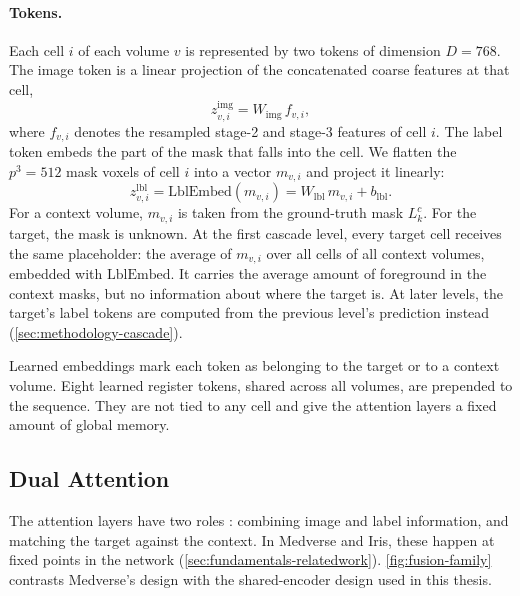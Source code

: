 \documentclass[hidelinks, a4paper, 12pt, ngerman, english]{article}  %
\begin{document}
\paragraph{Tokens.}
Each cell $i$ of each volume $v$ is represented by two tokens of dimension
$D = 768$. The image token is a linear projection of the concatenated coarse
features at that cell,
%
\begin{equation}
  z^{\text{img}}_{v,i} = W_{\text{img}} \, f_{v,i},
  \label{eq:img-token}
\end{equation}
%
where $f_{v,i}$ denotes the resampled stage-2 and stage-3 features of cell $i$.
The label token embeds the part of the mask that falls into the cell. We
flatten the $p^3 = 512$ mask voxels of cell $i$ into a vector $m_{v,i}$ and
project it linearly:
%
\begin{equation}
  z^{\text{lbl}}_{v,i} = \mathrm{LblEmbed}(m_{v,i}) = W_{\text{lbl}} \, m_{v,i} + b_{\text{lbl}}.
  \label{eq:lbl-token}
\end{equation}
%
For a context volume, $m_{v,i}$ is taken from the ground-truth mask $L^c_k$.
For the target, the mask is unknown. At the first cascade level, every target
cell receives the same placeholder: the average of $m_{v,i}$ over all cells of
all context volumes, embedded with $\mathrm{LblEmbed}$. It carries the average
amount of foreground in the context masks, but no information about where the
target is. At later levels, the target's label tokens are computed from the
previous level's prediction instead (\autoref{sec:methodology-cascade}).

Learned embeddings mark each token as belonging to the target or to a context
volume. Eight learned register tokens, shared across all volumes, are
prepended to the sequence. They are not tied to any cell and give the
attention layers a fixed amount of global memory.
\subsection{Dual Attention}\label{sec:methodology-fusion}

The attention layers have two roles : combining image and label information, and
matching the target against the context. In Medverse and Iris, these happen at
fixed points in the network (\autoref{sec:fundamentals-relatedwork}).
\autoref{fig:fusion-family} contrasts Medverse's design with the
shared-encoder design used in this thesis.
\end{document}
